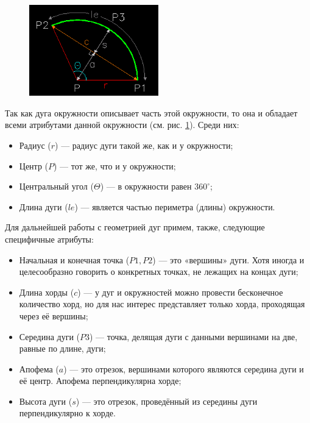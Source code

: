 \begin{figure}[H]
	\centering
	\includegraphics[width=0.5\textwidth]{figures/arcgeom.png}
	\label{fig:arcgeom}
\end{figure}

Так как дуга окружности описывает часть этой окружности, то она и обладает всеми атрибутами данной окружности (см. рис. \ref{fig:arcgeom}). Среди них:

\begin{itemize}
	\item Радиус ($r$) --- радиус дуги такой же, как и у окружности;
	\item Центр ($P$) --- тот же, что и у окружности;
	\item Центральный угол ($\Theta$) --- в окружности равен $360^{\circ}$;
	\item Длина дуги ($le$) --- является частью периметра (длины) окружности.
\end{itemize}

Для дальнейшей работы с геометрией дуг примем, также, следующие специфичные атрибуты:

\begin{itemize}
	\item Начальная и конечная точка ($P1, P2$) --- это «вершины» дуги. Хотя иногда и целесообразно говорить о конкретных точках, не лежащих на концах дуги;
	\item Длина хорды ($c$) --- у дуг и окружностей можно провести бесконечное количество хорд, но для нас интерес представляет только хорда, проходящая через её вершины;
	\item Середина дуги ($P3$) --- точка, делящая дуги с данными вершинами на две, равные по длине, дуги;
	\item Апофема ($a$) --- это отрезок, вершинами которого являются середина дуги и её центр. Апофема перпендикулярна хорде;
	\item Высота дуги ($s$) --- это отрезок, проведённый из середины дуги перпендикулярно к хорде.
\end{itemize}

